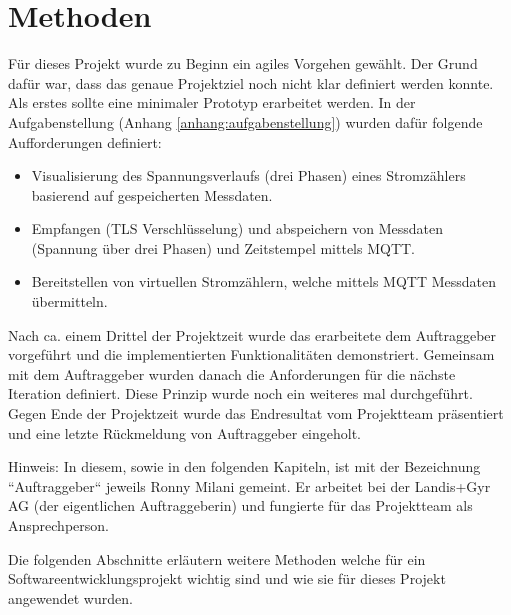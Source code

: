 \chapter{Methoden}
\label{methoden}
Für dieses Projekt wurde zu Beginn ein agiles Vorgehen gewählt.
Der Grund dafür war, dass das genaue Projektziel noch nicht klar definiert werden konnte.
Als erstes sollte eine minimaler Prototyp erarbeitet werden.
In der Aufgabenstellung (Anhang \ref{anhang:aufgabenstellung}) wurden dafür folgende Aufforderungen definiert:
\begin{itemize}
      \item Visualisierung des Spannungsverlaufs (drei Phasen) eines Stromzählers
            basierend auf gespeicherten Messdaten.
      \item Empfangen (TLS Verschlüsselung) und abspeichern von Messdaten (Spannung über drei Phasen) und
            Zeitstempel mittels MQTT.
      \item Bereitstellen von virtuellen Stromzählern, welche mittels MQTT Messdaten
            übermitteln.
\end{itemize}
Nach ca. einem Drittel der Projektzeit wurde das erarbeitete dem Auftraggeber vorgeführt und die implementierten Funktionalitäten demonstriert.
Gemeinsam mit dem Auftraggeber wurden danach die Anforderungen für die nächste Iteration definiert.
Diese Prinzip wurde noch ein weiteres mal durchgeführt.
Gegen Ende der Projektzeit wurde das Endresultat vom Projektteam präsentiert und eine letzte Rückmeldung von Auftraggeber eingeholt.


Hinweis: In diesem, sowie in den folgenden Kapiteln, ist mit der Bezeichnung ``Auftraggeber``
jeweils Ronny Milani gemeint.
Er arbeitet bei der Landis+Gyr AG (der eigentlichen Auftraggeberin) und fungierte für das Projektteam als Ansprechperson.



Die folgenden Abschnitte erläutern weitere Methoden welche für ein Softwareentwicklungsprojekt
wichtig sind und wie sie für dieses Projekt angewendet wurden.


